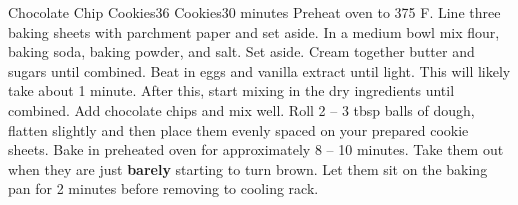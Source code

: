 \documentclass[../cookbook.tex]{subfiles}
\begin{document}
\begin{recipe}{Chocolate Chip Cookies}{36 Cookies}{30 minutes}
    Preheat oven to 375 \degrees{}F. Line three baking sheets with parchment
    paper and set aside.
    In a medium bowl mix flour, baking soda, baking powder, and salt. Set
    aside.
    Cream together butter and sugars until combined.
    Beat in eggs and vanilla extract until light. This will likely take about 1
    minute. After this, start mixing in the dry ingredients until combined.
    Add chocolate chips and mix well. Roll 2 -- 3 tbsp balls of dough, flatten
    slightly and then place them evenly spaced on your prepared cookie sheets.
    Bake in preheated oven for approximately 8 -- 10 minutes. Take them out
    when they are just \textbf{barely} starting to turn brown. Let them sit on
    the baking pan for 2 minutes before removing to cooling rack.

\end{recipe}
\end{document}
